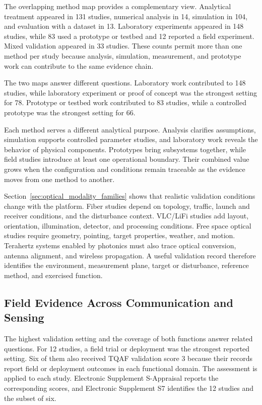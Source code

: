 The overlapping method map provides a complementary view. Analytical treatment
appeared in 131 studies, numerical analysis in 14, simulation in 104, and
evaluation with a dataset in 13. Laboratory experiments appeared in 148
studies, while 83 used a prototype or testbed and 12 reported a field
experiment. Mixed validation appeared in 33 studies. These counts permit more
than one method per study because analysis, simulation, measurement, and
prototype work can contribute to the same evidence chain.

The two maps answer different questions. Laboratory work contributed to 148
studies, while laboratory experiment or proof of concept was the strongest
setting for 78. Prototype or testbed work contributed to 83 studies, while a
controlled prototype was the strongest setting for 66.

Each method serves a different analytical purpose. Analysis clarifies
assumptions, simulation supports controlled parameter studies, and laboratory
work reveals the behavior of physical components. Prototypes bring subsystems
together, while field studies introduce at least one operational boundary.
Their combined value grows when the configuration and conditions remain
traceable as the evidence moves from one method to another.

Section~\ref{sec:optical_modality_families} shows that realistic validation
conditions change with the platform. Fiber studies depend on topology, traffic,
launch and receiver conditions, and the disturbance context. VLC/LiFi studies
add layout, orientation, illumination, detector, and processing conditions.
Free space optical studies require geometry, pointing, target properties,
weather, and motion. Terahertz systems enabled by photonics must also trace
optical conversion, antenna alignment, and wireless propagation. A useful
validation record therefore identifies the environment, measurement plane,
target or disturbance, reference method, and exercised function.

\subsection{Field Evidence Across Communication and Sensing}

The highest validation setting and the coverage of both functions answer
related questions. For 12 studies, a field trial or deployment was the
strongest reported setting. Six of them also received TQAF validation score 3
because their records report field or deployment outcomes in each functional
domain. The assessment is applied to each study. Electronic Supplement
S-Appraisal reports the corresponding scores, and Electronic Supplement S7
identifies the 12 studies and the subset of six.

